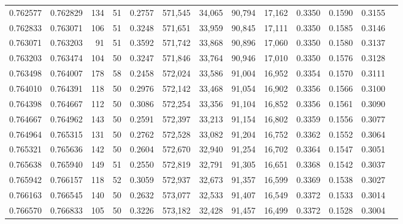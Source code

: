 \begin{tabular}{rrrrrrrrrrrrr}
0.762577 & 0.762829 &   134 &  51 &                                     0.2757 & 571,545 &  34,065 &  90,794 &  17,162 & 0.3350 & 0.1590 & 0.3155 \\
0.762833 & 0.763071 &   106 &  51 &                                     0.3248 & 571,651 &  33,959 &  90,845 &  17,111 & 0.3350 & 0.1585 & 0.3146 \\
0.763071 & 0.763203 &    91 &  51 &                                     0.3592 & 571,742 &  33,868 &  90,896 &  17,060 & 0.3350 & 0.1580 & 0.3137 \\
0.763203 & 0.763474 &   104 &  50 &                                     0.3247 & 571,846 &  33,764 &  90,946 &  17,010 & 0.3350 & 0.1576 & 0.3128 \\
0.763498 & 0.764007 &   178 &  58 &                                     0.2458 & 572,024 &  33,586 &  91,004 &  16,952 & 0.3354 & 0.1570 & 0.3111 \\
0.764010 & 0.764391 &   118 &  50 &                                     0.2976 & 572,142 &  33,468 &  91,054 &  16,902 & 0.3356 & 0.1566 & 0.3100 \\
0.764398 & 0.764667 &   112 &  50 &                                     0.3086 & 572,254 &  33,356 &  91,104 &  16,852 & 0.3356 & 0.1561 & 0.3090 \\
0.764667 & 0.764962 &   143 &  50 &                                     0.2591 & 572,397 &  33,213 &  91,154 &  16,802 & 0.3359 & 0.1556 & 0.3077 \\
0.764964 & 0.765315 &   131 &  50 &                                     0.2762 & 572,528 &  33,082 &  91,204 &  16,752 & 0.3362 & 0.1552 & 0.3064 \\
0.765321 & 0.765636 &   142 &  50 &                                     0.2604 & 572,670 &  32,940 &  91,254 &  16,702 & 0.3364 & 0.1547 & 0.3051 \\
0.765638 & 0.765940 &   149 &  51 &                                     0.2550 & 572,819 &  32,791 &  91,305 &  16,651 & 0.3368 & 0.1542 & 0.3037 \\
0.765942 & 0.766157 &   118 &  52 &                                     0.3059 & 572,937 &  32,673 &  91,357 &  16,599 & 0.3369 & 0.1538 & 0.3027 \\
0.766163 & 0.766545 &   140 &  50 &                                     0.2632 & 573,077 &  32,533 &  91,407 &  16,549 & 0.3372 & 0.1533 & 0.3014 \\
0.766570 & 0.766833 &   105 &  50 &                                     0.3226 & 573,182 &  32,428 &  91,457 &  16,499 & 0.3372 & 0.1528 & 0.3004 \\

\end{tabular}

